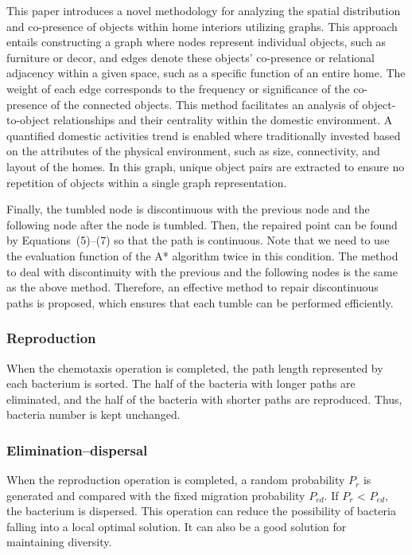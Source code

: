\documentclass{PDS}%
\theoremstyle{definition}
\begin{document}
This paper introduces a novel methodology for analyzing the spatial distribution and co-presence of
objects within home interiors utilizing graphs. This approach entails constructing a graph where nodes
represent individual objects, such as furniture or decor, and edges denote these objects' co-presence or
relational adjacency within a given space, such as a specific function of an entire home. The weight of
each edge corresponds to the frequency or significance of the co-presence of the connected objects. This
method facilitates an analysis of object-to-object relationships and their centrality within the domestic
environment. A quantified domestic activities trend is enabled where traditionally invested based on the
attributes of the physical environment, such as size, connectivity, and layout of the homes. In this graph,
unique object pairs are extracted to ensure no repetition of objects
within a single graph representation. 



Finally, the tumbled node is discontinuous with the previous node and the following node after
the node is tumbled. Then, the repaired point can be found by
Equations~(5)--(7) so that the path is continuous. Note that we need
to use the evaluation function of the A* algorithm twice in this condition.
The method to deal with discontinuity with the previous and the following nodes is the
same as the above method. Therefore, an effective method to repair discontinuous paths is
proposed, which ensures that each tumble can be performed efficiently.


\subsubsection{Reproduction}

When the chemotaxis operation is completed, the path length represented by each bacterium
is sorted. The half of the bacteria with longer paths are eliminated, and the half of the bacteria
with shorter paths are reproduced. Thus, bacteria number is kept unchanged.

\subsubsection{Elimination--dispersal}

When the reproduction operation is completed, a random probability $P_r$ is generated and
compared with the fixed migration probability $P_{ed}$. If $P_r$ < $P_{ed}$, the
bacterium is dispersed. This operation can reduce the possibility of bacteria falling
into a local optimal solution. It can also be a good solution for maintaining diversity.
\end{document}
